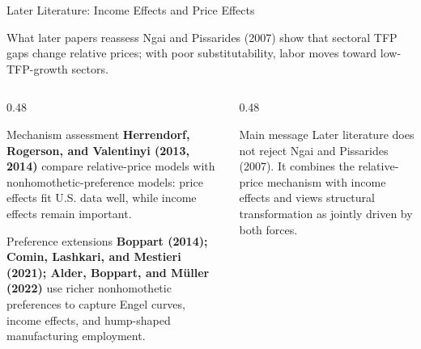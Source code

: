 \begin{frame}{Later Literature: Income Effects and Price Effects}
  \scriptsize
  \begin{alertblock}{What later papers reassess}
    Ngai and Pissarides (2007) show that sectoral TFP gaps change relative
    prices; with poor substitutability, labor moves toward low-TFP-growth sectors.
  \end{alertblock}

  \vspace{0.08cm}
  \begin{columns}[T,onlytextwidth]
    \begin{column}{0.48\textwidth}
      \begin{block}{Mechanism assessment}
        \textbf{Herrendorf, Rogerson, and Valentinyi (2013, 2014)}
        compare relative-price models with nonhomothetic-preference models:
        price effects fit U.S. data well, while income effects remain important.
      \end{block}

      \vspace{0.08cm}
      \begin{block}{Preference extensions}
        \textbf{Boppart (2014); Comin, Lashkari, and Mestieri (2021);
        Alder, Boppart, and M\"uller (2022)}
        use richer nonhomothetic preferences to capture Engel curves, income
        effects, and hump-shaped manufacturing employment.
      \end{block}
    \end{column}
    \begin{column}{0.48\textwidth}
      \begin{alertblock}{Main message}
        Later literature does not reject Ngai and Pissarides (2007). It combines
        the relative-price mechanism with income effects and views structural
        transformation as jointly driven by both forces.
      \end{alertblock}


\end{column}
\end{columns}
\end{frame}
